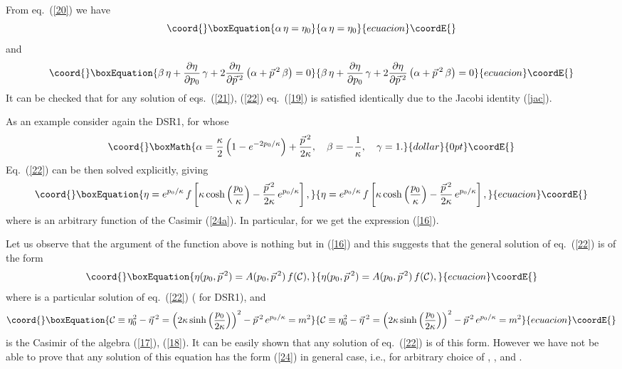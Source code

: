 \documentclass  [12pt] {article}
\def\vp{\vec{p}\, {}^2}
\providecommand{\dd}[2]{\frac{\partial #1}{\partial #2}}
\begin{document}
From eq.~(\ref{20}) we have
\begin{equation}\coord{}\boxEquation{\label{21}
  \alpha\, \eta =\eta_0
}{\alpha\, \eta =\eta_0
}{ecuacion}\coordE{}\end{equation}
and
\begin{equation}\coord{}\boxEquation{\label{22}
  \beta\, \eta +\dd{\eta}{p_0}\,\gamma +2 \dd{\eta}{\vp}\left(\alpha + \vp\, \beta\right) =0
}{\beta\, \eta +\dd{\eta}{p_0}\,\gamma +2 \dd{\eta}{\vp}\left(\alpha + \vp\, \beta\right) =0
}{ecuacion}\coordE{}\end{equation}
It can be checked that for any solution of eqs.~(\ref{21}), (\ref{22})
eq.~(\ref{19}) is satisfied identically due to the Jacobi identity (\ref{jac}).
\newline

As an example consider again the DSR1, for whose
$$\coord{}\boxMath{
\alpha = \frac{\kappa}{2}\left(1 - e^{-2p_0/\kappa}\right) +
\frac{\vp}{2\kappa}, \quad \beta = -\frac1\kappa, \quad \gamma =1.
}{dollar}{0pt}\coordE{}$$
Eq.~(\ref{22}) can be then solved explicitly, giving
\begin{equation}\coord{}\boxEquation{\label{23}
 \eta = e^{p_0/\kappa} \, f\left[\kappa\cosh\left(\frac{p_0}\kappa\right) - \frac{\vp}{2\kappa}\, e^{p_0/\kappa}\right],
}{\eta = e^{p_0/\kappa} \, f\left[\kappa\cosh\left(\frac{p_0}\kappa\right) - \frac{\vp}{2\kappa}\, e^{p_0/\kappa}\right],
}{ecuacion}\coordE{}\end{equation}
where \coordHE{} is an arbitrary function of the Casimir \coordHE{} (\ref{24a}). In
particular, for \coordHE{} we get the expression (\ref{16}).

Let us observe that the argument of the function \coordHE{} above is
nothing but \coordHE{} in (\ref{16}) and this suggests that the
general solution of eq.~(\ref{22}) is of the form
\begin{equation}\coord{}\boxEquation{\label{24}
  \eta(p_0, \vp) = A(p_0, \vp) \, f({\cal C}),
}{\eta(p_0, \vp) = A(p_0, \vp) \, f({\cal C}),
}{ecuacion}\coordE{}\end{equation}
where \myHighlight{$A(p_0, \vp)$}\coordHE{} is a particular solution of eq.\ (\ref{22})
(\myHighlight{$A(p_0, \vp)=e^{p_0/\kappa}$}\coordHE{} for DSR1), and
\begin{equation}\coord{}\boxEquation{\label{24a}
  {\cal C} \equiv \eta_0^2 - \vec{\eta}\, {}^2 = \left(2\kappa \sinh \left(\frac{p_0}{2\kappa}\right)\right)^2 -
\vec{p}\,{}^2\, e^{p_0/\kappa}= m^2
}{{\cal C} \equiv \eta_0^2 - \vec{\eta}\, {}^2 = \left(2\kappa \sinh \left(\frac{p_0}{2\kappa}\right)\right)^2 -
\vec{p}\,{}^2\, e^{p_0/\kappa}= m^2
}{ecuacion}\coordE{}\end{equation}
   is the Casimir of the algebra (\ref{17}), (\ref{18}). It can
be easily shown that any solution of eq.~(\ref{22}) is of this
form. However we have not be able to prove that any solution of
this equation has the form (\ref{24}) in general case, i.e., for
arbitrary choice of \myHighlight{$\alpha$}\coordHE{}, \myHighlight{$\beta$}\coordHE{}, and \myHighlight{$\gamma$}\coordHE{}.
\newline
\end{document}
